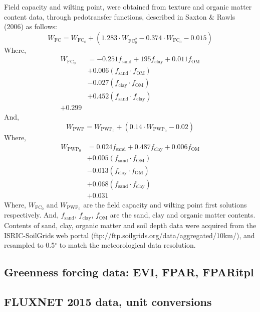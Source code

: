 \documentclass{myreport}
\begin{document}
Field capacity and wilting point, were obtained from texture and organic matter content data, through pedotransfer functions, described in Saxton \& Rawls (2006) as follows:
\begin{equation}
W_{\text{FC}}= W_{\text{FC}}_{0}+(1.283\cdot W_{\text{FC}}_{0}^{2}-0.374\cdot W_{\text{FC}}_{0}-0.015)
\end{equation}
Where,
\begin{align}
W_{\text{FC}}_{0} &=-0.251f_{\text{sand}}+195f_{\text{clay}}+0.011f_{\text{OM}}\\                            &+0.006(f_{\text{sand}}\cdot f_{\text{OM}})\\
                  &-0.027(f_{\text{clay}}\cdot f_{\text{OM}})\\
                  &+0.452 (f_{\text{sand}}\cdot f_{\text{clay}})\\
                  +0.299
\end{align}
And,
\begin{equation}
W_{\text{PWP}}=W_{\text{PWP}}_{0}+(0.14\cdot W_{\text{PWP}}_{0}-0.02)
\end{equation}
Where,
\begin{align}
W_{\text{PWP}}_{0} &=0.024 f_{\text{sand}} + 0.487 f_{\text{clay}} + 0.006 f_{\text{OM}} \\
                  &+0.005 ( f_{\text{sand}}\cdot f_{\text{OM}} )\\
                  &-0.013( f_{\text{clay}}\cdot f_{\text{OM}} )\\
                  &+0.068( f_{\text{sand}} \cdot f_{\text{clay}} )\\
                  &+0.031
\end{align}
Where, $W_{\text{FC}}_{0}$ and $W_{\text{PWP}}_{0}$ are the field capacity and wilting point first solutions respectively. And, $f_{\text{sand}}$, $f_{\text{clay}}$, $f_{\text{OM}}$ are the sand, clay and organic matter contents.
Contents of sand, clay, organic matter and soil depth data were acquired from the ISRIC-SoilGrids web portal (ftp://ftp.soilgrids.org/data/aggregated/10km/), and resampled to 0.5$^{\circ}$ to match the meteorological data resolution.



\subsection{Greenness forcing data: EVI, FPAR, FPARitpl}

\subsection{FLUXNET 2015 data, unit conversions}
\end{document}
